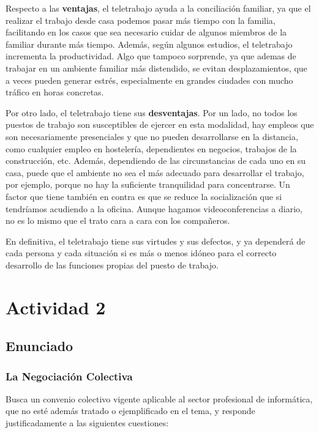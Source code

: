 Respecto a las \textbf{ventajas}, el teletrabajo ayuda a la conciliación familiar, ya que el realizar el trabajo desde casa podemos pasar más tiempo con la familia, facilitando en los casos que sea necesario cuidar de algunos miembros de la familiar durante más tiempo. Además, según algunos estudios, el teletrabajo incrementa la productividad. Algo que tampoco sorprende, ya que ademas de trabajar en un ambiente familiar más distendido, se evitan desplazamientos, que a veces pueden generar estrés, especialmente en grandes ciudades con mucho tráfico en horas concretas.

Por otro lado, el teletrabajo tiene sus \textbf{desventajas}. Por un lado, no todos los puestos de trabajo son susceptibles de ejercer en esta modalidad, hay empleos que son necesariamente presenciales y que no pueden desarrollarse en la distancia, como cualquier empleo en hostelería, dependientes en negocios, trabajos de la construcción, etc. Además, dependiendo de las circunstancias de cada uno en su casa, puede que el ambiente no sea el más adecuado para desarrollar el trabajo, por ejemplo, porque no hay la suficiente tranquilidad para concentrarse. Un factor que tiene también en contra es que se reduce la socialización que si tendríamos acudiendo a la oficina. Aunque hagamos videoconferencias a diario, no es lo mismo que el trato cara a cara con los compañeros.

En definitiva, el teletrabajo tiene sus virtudes y sus defectos, y ya dependerá de cada persona y cada situación si es más o menos idóneo para el correcto desarrollo de las funciones propias del puesto de trabajo.

\section{Actividad 2}
\subsection{Enunciado}

\subsubsection*{La Negociación Colectiva}
Busca un convenio colectivo vigente aplicable al sector profesional de informática, que no esté además tratado o ejemplificado en el tema, y responde justificadamente a las siguientes cuestiones:

